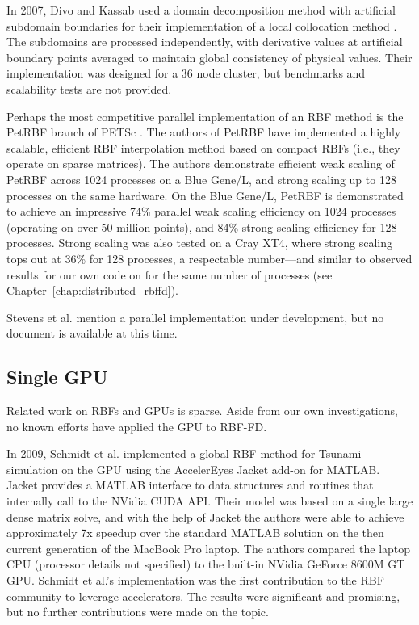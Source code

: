 \documentclass[11pt]{report}
\begin{document}
In 2007, Divo and Kassab \cite{Divo2007} used a domain decomposition method with artificial 
subdomain boundaries for their implementation of a local collocation method \cite{Divo2007}. 
The subdomains are processed independently, with derivative values 
at artificial boundary points averaged to maintain global consistency of physical values. Their implementation 
was designed for a 36 node cluster, but benchmarks and scalability tests are not provided.

Perhaps the most competitive parallel implementation of an RBF method is the PetRBF branch of PETSc \cite{Yokota2010}. The authors of PetRBF have implemented a highly scalable, efficient RBF interpolation method based on compact RBFs (i.e., they operate on sparse matrices). The authors demonstrate efficient weak scaling of PetRBF across 1024 processes on a Blue Gene/L, and strong scaling up to 128 processes on the same hardware. On the Blue Gene/L, PetRBF is demonstrated to achieve an impressive 74\% parallel weak scaling efficiency on 1024 processes (operating on over 50 million points), and 84\% strong scaling efficiency for 128 processes. Strong scaling was also tested on a Cray XT4, where strong scaling tops out at 36\% for 128 processes, a respectable number---and similar to observed results for our own code on for the same number of processes (see Chapter~\ref{chap:distributed_rbffd}).  


Stevens et al. \cite{Stevens2009a} mention a parallel implementation under development, but no document is available at this time. 



\subsection{Single GPU} 

Related work on RBFs and GPUs is sparse. Aside from our own investigations, no known efforts have applied the GPU to RBF-FD. 

In 2009, Schmidt et al. \cite{Schmidt2009a, Schmidt2009b} implemented a global RBF method for Tsunami simulation on the GPU using the AccelerEyes Jacket \cite{JacketGuide2009} add-on for MATLAB. Jacket provides a MATLAB interface to data structures and routines that internally call to the NVidia CUDA API. Their model was based on a single large dense matrix solve, and with the help of Jacket the authors were able to achieve approximately 7x speedup over the standard MATLAB solution on the then current generation of the MacBook Pro laptop. The authors compared the laptop CPU (processor details not specified) to the built-in NVidia GeForce 8600M GT GPU. Schmidt et al.'s implementation was the first contribution to the RBF community to leverage accelerators. The results were significant and promising, but no further contributions were made on the topic. 
\end{document}
